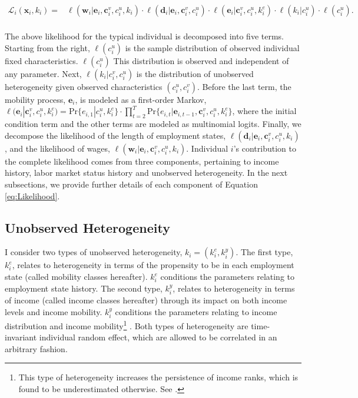 \documentclass[12pt, a4paper]{article}
\begin{document}
\begin{align}\label{eq:Likelihood}
\mathcal{L}_{i}(\textbf{x}_i,k_i)=&\ell(\textbf{w}_i|\textbf{e}_i,\textbf{c}_i^v,c_i^u,k_i)\cdot \ell(\textbf{d}_i|\textbf{e}_i,\textbf{c}_i^v,c_i^u)\cdot \ell(\textbf{e}_i|\textbf{c}_i^v,c_i^u,k_i^e)\cdot \ell(k_i|c_i^u)\cdot \ell (c_i^u).\\ \nonumber
\end{align}


The above likelihood for the typical individual is decomposed into five terms. Starting from the right, $\ell (c_i^u)$ is the sample distribution of observed individual fixed characteristics. $\ell (c_i^u)$ This distribution is observed and independent of any parameter. Next, $\ell(k_i|c_i^v,c_i^u)$ is the distribution of unobserved heterogeneity given observed characteristics $(c_i^u,c_i^v)$. Before the last term, the mobility process, $\textbf{e}_i$, is modeled as a first-order Markov, $\ell(\textbf{e}_i|\textbf{c}_{i}^{v},c_{i}^{u},k_{i}^{e})=\text{Pr}\{e_{i,1}|c_{i}^{u},k_{i}^{e}\}\cdot\prod\limits_{t=2}^{T}\text{Pr}\{e_{i,t}|\textbf{e}_{i,t-1},\textbf{c}_{i}^{v},c_{i}^{u},k_{i}^{e}\}$, where the initial condition term and the other terms are modeled as multinomial logits. Finally, we decompose the likelihood of the length of employment states, $\ell(\textbf{d}_i|\textbf{e}_i,\textbf{c}_i^v,c_i^u,k_i)$, and the likelihood of wages, $\ell(\textbf{w}_i|\textbf{e}_i,\textbf{c}_i^v,c_i^u,k_i)$. Individual $i$'s contribution to the complete likelihood comes from three components, pertaining to income history, labor market status history and unobserved heterogeneity. In the next subsections, we provide further details of each component of Equation \ref{eq:Likelihood}.

\subsection{Unobserved Heterogeneity}\label{sec:unobs_het}

I consider two types of unobserved heterogeneity, $k_i=(k_i^e,k_i^y)$. The first type, $k_i^e$, relates to heterogeneity in terms of the propensity to be in each employment state (called mobility classes hereafter). $k_i^e$ conditions the parameters relating to employment state history. The second type, $k_i^y$, relates to heterogeneity in terms of income (called income classes hereafter) through its impact on both income levels and income mobility. $k_i^y$ conditions the parameters relating to income distribution and income mobility\footnote{This type of heterogeneity increases the persistence of income ranks, which is found to be underestimated otherwise. See \cite{Sh76}.} . Both types of heterogeneity are time-invariant individual random effect, which are allowed to be correlated in an arbitrary fashion.
\end{document}

